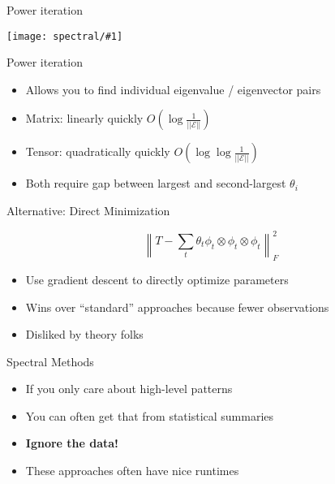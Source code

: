 \documentclass[compress]{beamer}
\newcommand{\normbar}[1]{\left\lVert#1\right\rVert}
\newcommand{\gfx}[2]{
\begin{center}
	\texttt{[image: spectral/\#1]}
\end{center}
}
\begin{document}
\begin{frame}{Power iteration}

  \gfx{power_decomp}{.8}

\end{frame}

\begin{frame}{Power iteration}

  \begin{itemize}
    \item Allows you to find individual eigenvalue / eigenvector pairs
    \item Matrix: linearly quickly $O\left(\log \frac{1}{||\mathcal{E}||} \right)$
    \item Tensor: quadratically quickly $O\left(\log \log \frac{1}{||\mathcal{E}||} \right)$
    \item Both require gap between largest and second-largest $\theta_i$
  \end{itemize}
\end{frame}


\begin{frame}{Alternative: Direct Minimization}

  \begin{equation}
    \normbar{T - \sum_t \theta_t \phi_t \otimes \phi_t \otimes \phi_t}_F^2
  \end{equation}

  \begin{itemize}
    \item Use gradient descent to directly optimize parameters
    \item Wins over ``standard'' approaches because fewer observations
    \item Disliked by theory folks
  \end{itemize}

\end{frame}

\begin{frame}{Spectral Methods}

  \begin{itemize}
    \item If you only care about high-level patterns
    \item You can often get that from statistical summaries
    \item {\bf Ignore the data!}
    \item These approaches often have nice runtimes
  \end{itemize}

\end{frame}
\end{document}
